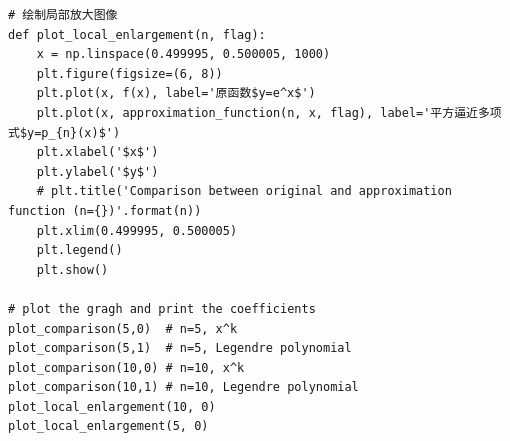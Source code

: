\documentclass[UTF8,ctexart,a4paper,11pt,openany]{article}
\theoremstyle{definition}
\begin{document}
\begin{lstlisting}[aboveskip=0pt]
# 绘制局部放大图像
def plot_local_enlargement(n, flag):
    x = np.linspace(0.499995, 0.500005, 1000)
    plt.figure(figsize=(6, 8))
    plt.plot(x, f(x), label='原函数$y=e^x$')
    plt.plot(x, approximation_function(n, x, flag), label='平方逼近多项式$y=p_{n}(x)$')
    plt.xlabel('$x$')
    plt.ylabel('$y$')
    # plt.title('Comparison between original and approximation function (n={})'.format(n))
    plt.xlim(0.499995, 0.500005)
    plt.legend()
    plt.show()

# plot the gragh and print the coefficients
plot_comparison(5,0)  # n=5, x^k
plot_comparison(5,1)  # n=5, Legendre polynomial
plot_comparison(10,0) # n=10, x^k
plot_comparison(10,1) # n=10, Legendre polynomial
plot_local_enlargement(10, 0)
plot_local_enlargement(5, 0)
\end{lstlisting}

\clearpage



\end{document}
